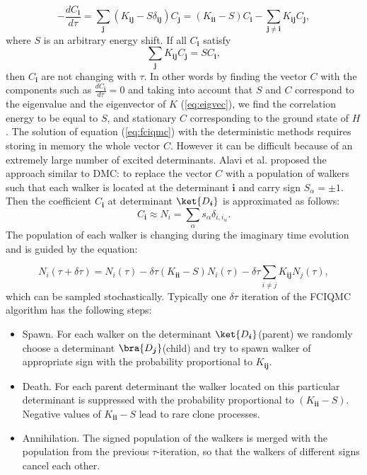 \documentclass[twoside,english]{uiofysmaster}
\begin{document}
\begin{equation}\label{eq:fciqmc}
-\frac{d C_{\boldsymbol{i}}}{d \tau} = \sum_{\boldsymbol{j}}(K_{\boldsymbol{ij}} - S\delta_{\boldsymbol{ij}}) C_{\boldsymbol{j}} = (K_{\boldsymbol{ii}} - S)C_{\boldsymbol{i}} - \sum_{\boldsymbol{j} \neq \boldsymbol{i}}K_{\boldsymbol{ij}}C_{\boldsymbol{j}},
\end{equation}
where $S$ is an arbitrary energy shift. If all $C_{\boldsymbol{i}}$ satisfy 
\begin{equation}\label{eq:eigvec}
\sum_{\boldsymbol{j}} K_{\boldsymbol{ij}}C_{\boldsymbol{j}} = S C_{\boldsymbol{i}},
\end{equation}
then $C_{\boldsymbol{i}}$ are not changing with $\tau$. In other words
by finding the vector $C$ with the components such as
$\frac{dC_{\boldsymbol{i}}}{d\tau} = 0$ and taking into account that
$S$ and $C$ correspond to the eigenvalue and the eigenvector of $K$
(\ref{eq:eigvec}), we find the correlation energy to be equal to $S$,
and stationary $C$ corresponding to the ground state of $H$.  The
solution of equation (\ref{eq:fciqmc}) with the deterministic methods
requires storing in memory the whole vector $C$. However it can be
difficult because of an extremely large number of excited
determinants. Alavi et al. \cite{BoothFermionMonteCarlo2009} proposed
the approach similar to DMC: to replace the vector $C$ with a
population of walkers such that each walker is located at the
determinant $\boldsymbol{i}$ and carry sign $S_\alpha = \pm 1$. Then
the coefficient $C_{\boldsymbol{i}}$ at determinant
$\ket{D_{\boldsymbol{i}}}$ is approximated as follows:
\begin{equation}
C_{\boldsymbol{i}} \approx N_i = \sum_{\alpha} s_\alpha \delta_{i, i_\alpha}.
\end{equation}
The population of each walker is changing during the imaginary time evolution and is guided by the equation:

\begin{equation}
N_i(\tau + \delta\tau) = N_i(\tau) - \delta\tau ( K_{\boldsymbol{ii}}-S)N_i(\tau) - \delta \tau \sum_{i \neq j}  K_{\boldsymbol{ij}}N_j(\tau),
\end{equation}
which can be sampled stochastically.
Typically one $\delta\tau$ iteration of the FCIQMC algorithm has the following steps:
\begin{itemize}
	\item Spawn. For each walker on the determinant $\ket{D_{\boldsymbol{i}}}$(parent) we randomly choose a determinant $\bra{D_{\boldsymbol{j}}}$(child) and try to spawn walker of appropriate sign with the probability proportional to $K_{\boldsymbol{ij}}$.
	\item Death. For each parent determinant the walker located on this particular determinant is suppressed with the probability proportional to $(K_{\boldsymbol{ii}}-S)$. Negative values of $K_{\boldsymbol{ii}}-S$ lead to rare clone processes.
	\item Annihilation. The signed population of the walkers is merged with the population from the previous $\tau$-iteration, so that the walkers of different signs cancel each other.
\end{itemize}
\end{document}
